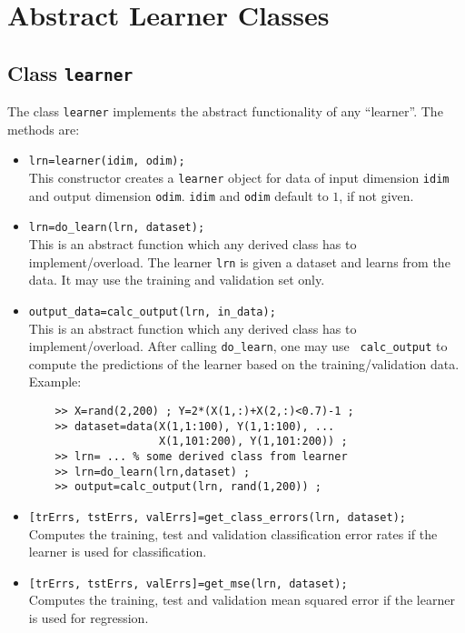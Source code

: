 \documentclass{article}
\begin{document}
\section{Abstract Learner Classes}
\subsection{Class {\tt learner}}

The class {\tt learner} implements the abstract functionality of any
``learner''. The methods are:
\begin{itemize}
\item {\tt lrn=learner(idim, odim);}\\
  This constructor creates a {\tt learner} object for data of input dimension
  {\tt idim} and output dimension {\tt odim}. {\tt idim} and {\tt odim}
  default to $1$, if not given.
\item {\tt lrn=do\_learn(lrn, dataset);}\\
  This is an abstract function which any derived class has to
  implement/overload. The learner {\tt lrn} is given a dataset and learns from
  the data. It may use the training and validation set only.
\item {\tt output\_data=calc\_output(lrn, in\_data);}\\
  This is an abstract function which any derived class has to
  implement/overload. After calling {\tt do\_learn}, one may use {\tt
    calc\_output} to compute the predictions of the learner based on the
  training/validation data.\\
  Example:
  \begin{verbatim}
    >> X=rand(2,200) ; Y=2*(X(1,:)+X(2,:)<0.7)-1 ;
    >> dataset=data(X(1,1:100), Y(1,1:100), ...
                    X(1,101:200), Y(1,101:200)) ;
    >> lrn= ... % some derived class from learner
    >> lrn=do_learn(lrn,dataset) ;
    >> output=calc_output(lrn, rand(1,200)) ;
  \end{verbatim}
  \vspace*{-5mm}
\item {\tt [trErrs, tstErrs, valErrs]=get\_class\_errors(lrn, dataset);}\\
  Computes the training, test and validation classification error rates if the
  learner is used for classification.
\item {\tt [trErrs, tstErrs, valErrs]=get\_mse(lrn, dataset);}\\
  Computes the training, test and validation mean squared error if the learner
  is used for regression.
\end{itemize}
\end{document}

